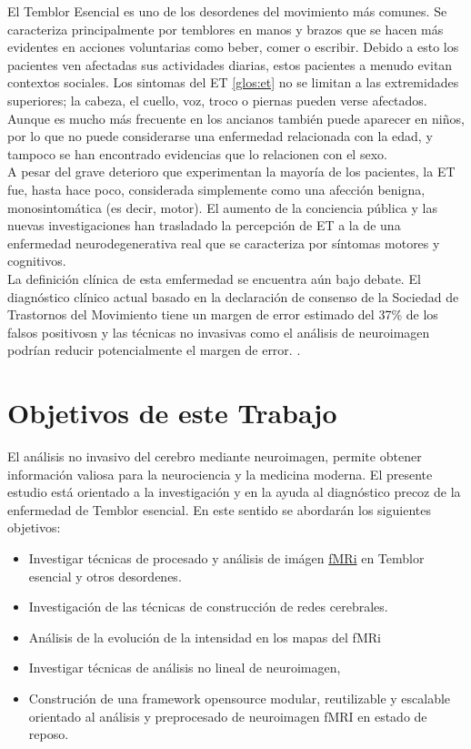  El Temblor Esencial es uno de los desordenes del movimiento más comunes. Se caracteriza principalmente por temblores en manos y brazos que se hacen más evidentes en acciones voluntarias como beber, comer o escribir. Debido a esto los pacientes ven afectadas sus actividades diarias, estos pacientes a menudo evitan contextos sociales. Los sintomas del ET \ref{glos:et} no se limitan a las extremidades superiores; la cabeza, el cuello, voz, troco o piernas pueden verse afectados. Aunque es mucho más frecuente en los ancianos también puede aparecer en niños, por lo que no puede considerarse una enfermedad relacionada con la edad, y tampoco se han encontrado evidencias que lo relacionen con el sexo.\\
A pesar del grave deterioro que experimentan la mayoría de los pacientes, la ET fue, hasta hace poco, considerada simplemente como una afección benigna, monosintomática (es decir, motor). El aumento de la conciencia pública y las nuevas investigaciones han trasladado la percepción de ET a la de una enfermedad neurodegenerativa real que se caracteriza por síntomas motores y cognitivos.\\
La definición clínica de esta emfermedad se encuentra aún bajo debate. El diagnóstico clínico actual basado en la declaración de consenso de la Sociedad de Trastornos del Movimiento tiene un margen de error estimado del 37\% de los falsos positivosn y las técnicas no invasivas como el análisis de neuroimagen podrían reducir potencialmente el margen de error.
.\cite{neuessentialsinet}


\section{Objetivos de este Trabajo}

El análisis no invasivo del cerebro mediante neuroimagen, permite obtener información valiosa para la neurociencia y la medicina moderna. El presente estudio está orientado a la investigación y en la ayuda al diagnóstico precoz de la enfermedad de Temblor esencial. En este sentido se abordarán los siguientes objetivos:

\begin{itemize}
\item Investigar técnicas de procesado y análisis de imágen \hyperref[glos:fmri]{fMRi} en Temblor esencial y otros desordenes.
\item Investigación de las técnicas de construcción de redes cerebrales.
\item Análisis de la evolución de la intensidad en los mapas del fMRi
\item Investigar técnicas de análisis no lineal de neuroimagen,
\item Construción de una framework opensource modular, reutilizable y escalable orientado al análisis y preprocesado de neuroimagen fMRI en estado de reposo.
\end{itemize}


